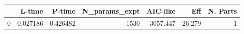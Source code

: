 \begin{tabular}{lrrrrrr}
\toprule
{} &    L-time &    P-time &  N\_params\_expt &  AIC-like &     Eff &  N. Parts \\
\midrule
0 &  0.027186 &  0.426482 &           1530 &  3057.447 &  26.279 &         1 \\
\bottomrule
\end{tabular}
